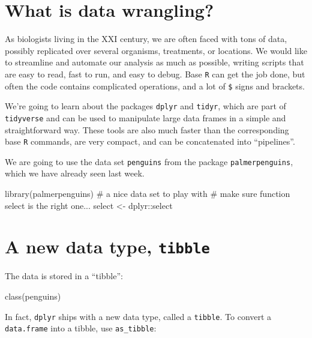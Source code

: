 \documentclass[
  letterpaper,
  DIV=11,
  numbers=noendperiod]{scrreprt}
\newenvironment{Shaded}{\begin{snugshade}}{\end{snugshade}}
\newcommand{\NormalTok}[1]{\textcolor[rgb]{0.00,0.23,0.31}{#1}}
\begin{document}
\section{What is data wrangling?}\label{what-is-data-wrangling}

As biologists living in the XXI century, we are often faced with tons of
data, possibly replicated over several organisms, treatments, or
locations. We would like to streamline and automate our analysis as much
as possible, writing scripts that are easy to read, fast to run, and
easy to debug. Base \texttt{R} can get the job done, but often the code
contains complicated operations, and a lot of \texttt{\$} signs and
brackets.

We're going to learn about the packages \texttt{dplyr} and
\texttt{tidyr}, which are part of \texttt{tidyverse} and can be used to
manipulate large data frames in a simple and straightforward way. These
tools are also much faster than the corresponding base \texttt{R}
commands, are very compact, and can be concatenated into ``pipelines''.

We are going to use the data set \texttt{penguins} from the package
\texttt{palmerpenguins}, which we have already seen last week.

\begin{Shaded}
\begin{Highlighting}[]
\NormalTok{library(palmerpenguins) \# a nice data set to play with}
\NormalTok{\# make sure function select is the right one...}
\NormalTok{select \textless{}{-} dplyr::select}
\end{Highlighting}
\end{Shaded}

\section{\texorpdfstring{A new data type,
\texttt{tibble}}{A new data type, tibble}}\label{a-new-data-type-tibble}

The data is stored in a ``tibble'':

\begin{Shaded}
\begin{Highlighting}[]
\NormalTok{class(penguins)}
\end{Highlighting}
\end{Shaded}

In fact, \texttt{dplyr} ships with a new data type, called a
\texttt{tibble}. To convert a \texttt{data.frame} into a tibble, use
\texttt{as\_tibble}:
\end{document}
